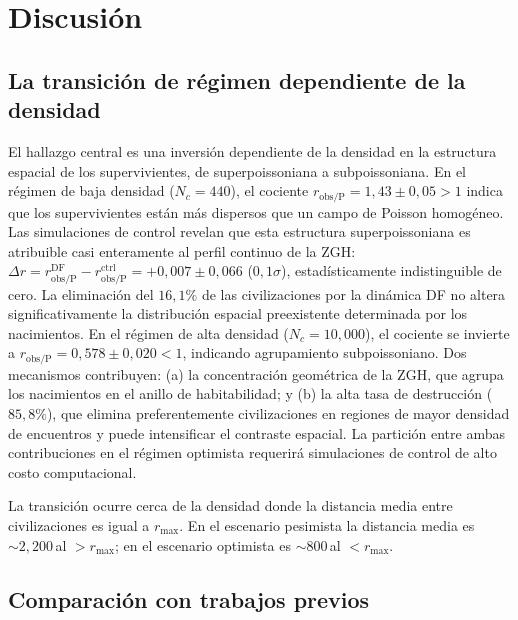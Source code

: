 \documentclass[11pt,a4paper,onecolumn]{article}
\begin{document}
\begin{table}[h]
\section{Discusión}
\label{sec:discussion}

\subsection{La transición de régimen dependiente de la densidad}

El hallazgo central es una inversión dependiente de la densidad en la
estructura espacial de los supervivientes, de superpoissoniana
a subpoissoniana.
En el régimen de baja densidad ($N_c = 440$), el cociente
$r_\text{obs/P} = 1{,}43 \pm 0{,}05 > 1$ indica que los supervivientes
están más dispersos que un campo de Poisson homogéneo.
Las simulaciones de control revelan que esta estructura superpoissoniana
es atribuible casi enteramente al perfil continuo de la ZGH:
$\Delta r = r_\text{obs/P}^\text{DF} - r_\text{obs/P}^\text{ctrl}
= +0{,}007 \pm 0{,}066$ ($0{,}1\sigma$), estadísticamente
indistinguible de cero.
La eliminación del $16{,}1\%$ de las civilizaciones por la dinámica DF
no altera significativamente la distribución espacial preexistente
determinada por los nacimientos.
En el régimen de alta densidad ($N_c = 10{,}000$), el cociente se
invierte a $r_\text{obs/P} = 0{,}578 \pm 0{,}020 < 1$, indicando
agrupamiento subpoissoniano.
Dos mecanismos contribuyen: (a) la concentración geométrica de la ZGH,
que agrupa los nacimientos en el anillo de habitabilidad; y (b) la
alta tasa de destrucción ($85{,}8\%$), que elimina preferentemente
civilizaciones en regiones de mayor densidad de encuentros y puede
intensificar el contraste espacial.
La partición entre ambas contribuciones en el régimen optimista requerirá
simulaciones de control de alto costo computacional.

La transición ocurre cerca de la densidad donde la distancia media
entre civilizaciones es igual a $r_\text{max}$.
En el escenario pesimista la distancia media es $\sim 2{,}200$\,al
$> r_\text{max}$; en el escenario optimista es $\sim 800$\,al
$< r_\text{max}$.

\subsection{Comparación con trabajos previos}


\end{table}
\end{document}
